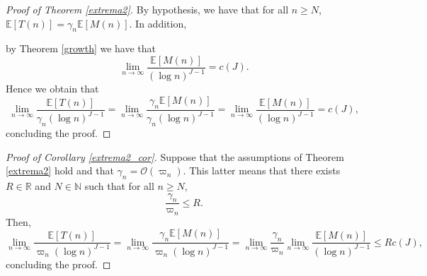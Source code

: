 \documentclass[12pt, reqno]{amsart}
\theoremstyle{definition}
\begin{document}
\begin{proof}[Proof of Theorem \ref{extrema2}]
By hypothesis, we have that for all $n\geq N$, $\mathbb{E}[T(n)]=\gamma_n \mathbb{E}[M(n)]$.
In addition, 

by Theorem \ref{growth} we have that 
$$\lim_{n \rightarrow \infty} \frac{\mathbb{E}[M(n)]}{(\log n)^{J-1}} =c(J).$$
Hence we obtain that
$$\lim_{n\rightarrow\infty} \frac{\mathbb{E}[T(n)]}{{\gamma_n}(\log n)^{J-1}}=\lim_{n\rightarrow\infty} \frac{\gamma_n\mathbb{E}[M(n)]}{{\gamma_n}(\log n)^{J-1}}= \lim_{n\rightarrow\infty} \frac{\mathbb{E}[M(n)]}{(\log n)^{J-1}}= c(J),$$
concluding the proof.

\end{proof}

\begin{proof}[Proof of Corollary \ref{extrema2_cor}]
Suppose that the assumptions of Theorem \ref{extrema2} hold and that $\gamma_n=\mathcal{O}(\varpi_n)$. This latter means that there exists $R\in\mathbb{R}$ and $N\in\mathbb{N}$ such that for all $n\geq N$,
$$\frac{\gamma_n}{\varpi_n} \leq R.$$
Then,
$$\lim_{n\rightarrow\infty} \frac{\mathbb{E}[T(n)]}{\varpi_n (\log n)^{J-1}}=\lim_{n\rightarrow\infty} \frac{\gamma_n \mathbb{E}[M(n)]}{\varpi_n (\log n)^{J-1}}=\lim_{n\rightarrow\infty} \frac{\gamma_n}{\varpi_n} \lim_{n\rightarrow\infty} \frac{\mathbb{E}[M(n)]}{(\log n)^{J-1}} \leq R c(J),$$
concluding the proof. 

\end{proof}
\end{document}
